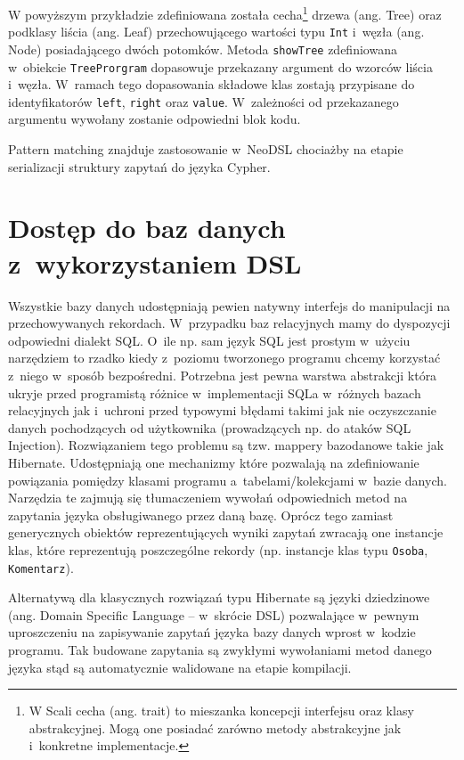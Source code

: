 \documentclass{xmgr}
\begin{document}
W powyższym przykładzie zdefiniowana została cecha\footnote{W Scali cecha (ang. trait) to mieszanka koncepcji interfejsu oraz klasy abstrakcyjnej. Mogą one posiadać zarówno metody abstrakcyjne jak i~konkretne implementacje.} drzewa (ang. Tree) oraz podklasy liścia (ang. Leaf) przechowującego wartości typu \texttt{Int} i~węzła (ang. Node) posiadającego dwóch potomków. Metoda \texttt{showTree} zdefiniowana w~obiekcie \texttt{TreeProrgram} dopasowuje przekazany argument do wzorców liścia i~węzła. W~ramach tego dopasowania składowe klas zostają przypisane do identyfikatorów \texttt{left}, \texttt{right} oraz \texttt{value}. W~zależności od przekazanego argumentu wywołany zostanie odpowiedni blok kodu.

Pattern matching znajduje zastosowanie w~NeoDSL chociażby na etapie serializacji struktury zapytań do języka Cypher.

\chapter{Dostęp do baz danych z~wykorzystaniem DSL}

Wszystkie bazy danych udostępniają pewien natywny interfejs do manipulacji na przechowywanych rekordach. W~przypadku baz relacyjnych mamy do dyspozycji odpowiedni dialekt SQL. O~ile np. sam język SQL jest prostym w~użyciu narzędziem to rzadko kiedy z~poziomu tworzonego programu chcemy korzystać z~niego w~sposób bezpośredni. Potrzebna jest pewna warstwa abstrakcji która ukryje przed programistą różnice w~implementacji SQLa w~różnych bazach relacyjnych jak i~uchroni przed typowymi błędami takimi jak nie oczyszczanie danych pochodzących od użytkownika (prowadzących np. do ataków SQL Injection). Rozwiązaniem tego problemu są tzw. mappery bazodanowe takie jak Hibernate. Udostępniają one mechanizmy które pozwalają na zdefiniowanie powiązania pomiędzy klasami programu a~tabelami/kolekcjami w~bazie danych. Narzędzia te zajmują się tłumaczeniem wywołań odpowiednich metod na zapytania języka obsługiwanego przez daną bazę. Oprócz tego zamiast generycznych obiektów reprezentujących wyniki zapytań zwracają one instancje klas, które reprezentują poszczególne rekordy (np. instancje klas typu \texttt{Osoba}, \texttt{Komentarz}).

Alternatywą dla klasycznych rozwiązań typu Hibernate są języki dziedzinowe (ang. Domain Specific Language -- w~skrócie DSL)  pozwalające w~pewnym uproszczeniu na zapisywanie zapytań języka bazy danych wprost w~kodzie programu. Tak budowane zapytania są zwykłymi wywołaniami metod danego języka stąd są automatycznie walidowane na etapie kompilacji.
\end{document}
